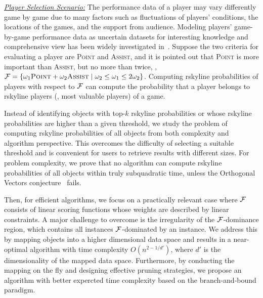\noindent\underline{\it Player Selection Scenario:}
The performance data of a player may vary differently game by game due to many factors such as fluctuations of players’ conditions, the locations of the games, and the support from audience.
Modeling players' game-by-game performance data as uncertain datasets for interesting knowledge and comprehensive view has been widely investigated in~\cite{DBLP:conf/vldb/PeiJLY07, DBLP:conf/cikm/LiuZXLL15, DBLP:journals/tkde/KimIP12}.
Suppose the two criteria for evaluating a player are \textsc{Point} and \textsc{Assist}, and it is pointed out that \textsc{Point} is more important than \textsc{Assist}, but no more than twice, \ie, $\mathcal{F} = \{\omega_1 \textsc{Point} + \omega_2 \textsc{Assist} \mid \omega_2 \le \omega_1 \le 2\omega_2\}$.
Computing rskyline probabilities of players with respect to $\mathcal{F}$ can compute the probability that a player belongs to rskyline players (\eg, most valuable players) of a game.

Instead of identifying objects with top-$k$ rskyline probabilities or whose rskyline probabilities are higher than a given threshold, we study the problem of computing rskyline probabilities of all objects from both complexity and algorithm perspective.
This overcomes the difficulty of selecting a suitable threshold and is convenient for users to retrieve results with different sizes.
For problem complexity, we prove that no algorithm can compute rskyline probabilities of all objects within truly subquadratic time, unless the Orthogonal Vectors conjecture~\cite{DBLP:conf/stacs/Bringmann19} fails.

Then, for efficient algorithms, we focus on a practically relevant case where $\mathcal{F}$ consists of linear scoring functions whose weights are described by linear constraints.
A major challenge to overcome is the irregularity of the $\mathcal{F}$-dominance region, which contains all instances $\mathcal{F}$-dominated by an instance.
We address this by mapping objects into a higher dimensional data space and results in a near-optimal algorithm with time complexity $O(n^{2 - 1/d'})$, where $d'$ is the dimensionality of the mapped data space.
Furthermore, by conducting the mapping on the fly and designing effective pruning strategies, we propose an algorithm with better expercted time complexity based on the branch-and-bound paradigm.

